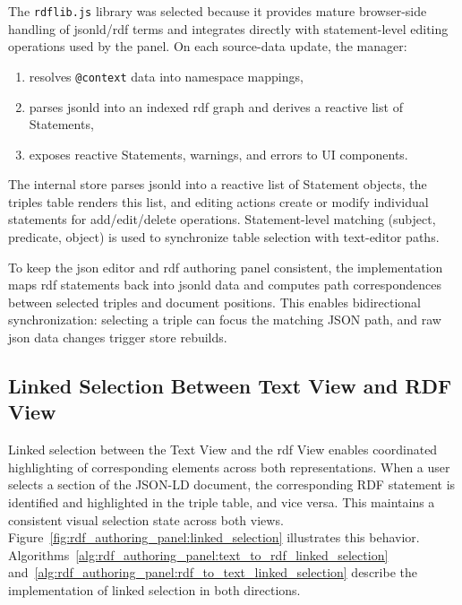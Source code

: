 The \texttt{rdflib.js} library was selected because it provides mature browser-side handling of \gls{jsonld}/\gls{rdf} terms and integrates directly with statement-level editing operations used by the panel. On each source-data update, the manager:
\begin{enumerate}
    \item resolves \texttt{@context} data into namespace mappings,
    \item parses \gls{jsonld} into an indexed \gls{rdf} graph and derives a reactive list of Statements,
    \item exposes reactive Statements, warnings, and errors to UI components.
\end{enumerate}

The internal store parses \gls{jsonld} into a reactive list of Statement objects, the triples table renders this list, and editing actions create or modify individual statements for add/edit/delete operations. Statement-level matching (subject, predicate, object) is used to synchronize table selection with text-editor paths.

To keep the \gls{json} editor and \gls{rdf} authoring panel consistent, the implementation maps \gls{rdf} statements back into \gls{jsonld} data and computes path correspondences between selected triples and document positions. This enables bidirectional synchronization: selecting a triple can focus the matching JSON path, and raw \gls{json} data changes trigger store rebuilds.

\newpage

\subsection{Linked Selection Between Text View and RDF View}
\label{sec:design:rdf-authoring-panel:linked-selection}

Linked selection between the Text View and the \gls{rdf} View enables coordinated highlighting of corresponding elements across both representations. When a user selects a section of the JSON-LD document, the corresponding RDF statement is identified and highlighted in the triple table, and vice versa. This maintains a consistent visual selection state across both views. Figure~\ref{fig:rdf_authoring_panel:linked_selection} illustrates this behavior. 
Algorithms~\ref{alg:rdf_authoring_panel:text_to_rdf_linked_selection} and~\ref{alg:rdf_authoring_panel:rdf_to_text_linked_selection} describe the implementation of linked selection in both directions.


